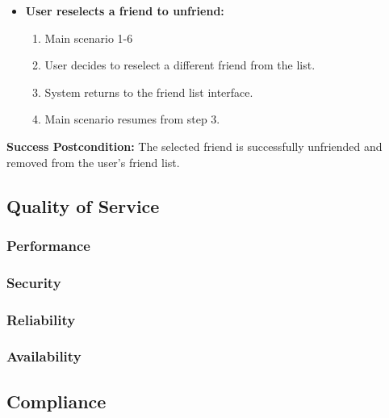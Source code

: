 \documentclass{article}
\begin{document}
\begin{enumerate}[label=\textbf{UC\arabic*}]
\begin{itemize}
              \item[{}] \textbf{User reselects a friend to unfriend:}
                  \begin{enumerate}[label=\textbf{\arabic*.}]
                      \item Main scenario 1-6
                      \item User decides to reselect a different friend from the list.
                      \item System returns to the friend list interface.
                      \item Main scenario resumes from step 3.
                  \end{enumerate}
          \end{itemize}

          \textbf{Success Postcondition:} The selected friend is successfully unfriended and removed from the user's friend list.

\end{enumerate}

\subsection{Quality of Service}

\subsubsection{Performance}


\subsubsection{Security}


\subsubsection{Reliability}


\subsubsection{Availability}


\subsection{Compliance}
\label{sub:compliance}
\end{document}
